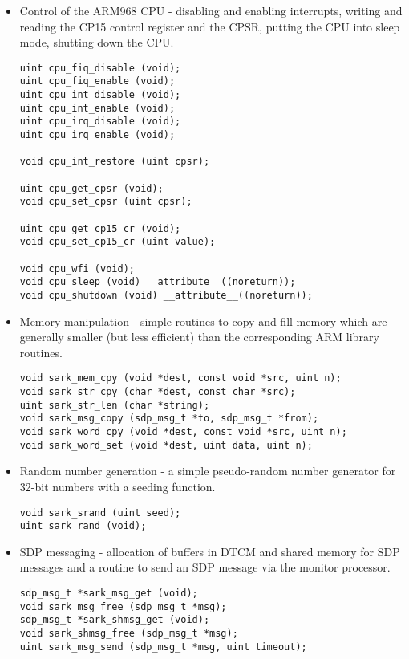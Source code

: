 \begin{itemize}

\item
Control of the ARM968 CPU - disabling and enabling interrupts, writing
and reading the CP15 control register and the CPSR, putting the CPU
into sleep mode, shutting down the CPU.

\lstset{language=C}
\begin{lstlisting}
uint cpu_fiq_disable (void);
uint cpu_fiq_enable (void);
uint cpu_int_disable (void);
uint cpu_int_enable (void);
uint cpu_irq_disable (void);
uint cpu_irq_enable (void);

void cpu_int_restore (uint cpsr);

uint cpu_get_cpsr (void);
void cpu_set_cpsr (uint cpsr);

uint cpu_get_cp15_cr (void);
void cpu_set_cp15_cr (uint value);

void cpu_wfi (void);
void cpu_sleep (void) __attribute__((noreturn));
void cpu_shutdown (void) __attribute__((noreturn));
\end{lstlisting}

\item
Memory manipulation - simple routines to copy and fill memory which
are generally smaller (but less efficient) than the corresponding ARM
library routines.

\lstset{language=C}
\begin{lstlisting}
void sark_mem_cpy (void *dest, const void *src, uint n);
void sark_str_cpy (char *dest, const char *src);
uint sark_str_len (char *string);
void sark_msg_copy (sdp_msg_t *to, sdp_msg_t *from);
void sark_word_cpy (void *dest, const void *src, uint n);
void sark_word_set (void *dest, uint data, uint n);
\end{lstlisting}

\item
Random number generation - a simple pseudo-random number generator for
32-bit numbers with a seeding function.

\lstset{language=C}
\begin{lstlisting}
void sark_srand (uint seed);
uint sark_rand (void);
\end{lstlisting}

\item
SDP messaging - allocation of buffers in DTCM and shared memory for
SDP messages and a routine to send an SDP message via the monitor
processor.

\lstset{language=C}
\begin{lstlisting}
sdp_msg_t *sark_msg_get (void);
void sark_msg_free (sdp_msg_t *msg);
sdp_msg_t *sark_shmsg_get (void);
void sark_shmsg_free (sdp_msg_t *msg);
uint sark_msg_send (sdp_msg_t *msg, uint timeout);
\end{lstlisting}


\end{itemize}
